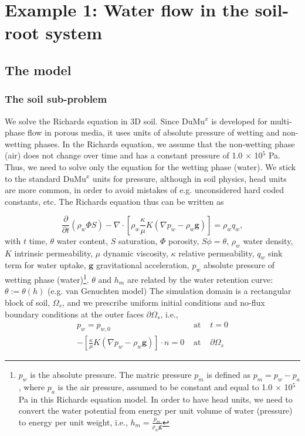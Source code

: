 \chapter*{Example 1: Water flow in the soil-root system}

\section*{The model}
\subsection*{The soil sub-problem}
We solve the Richards equation in 3D soil. Since DuMu$^x$ is developed for multi-phase flow in porous media, it uses units of absolute pressure of wetting and non-wetting phases. In the Richards equation, we assume that the non-wetting phase (air) does not change over time and has a constant pressure of 1.0 $\times$ 10$^5$ Pa. Thus, we need to solve only the equation for the wetting phase (water). We stick to the standard DuMu$^x$ units for pressure, although in soil physics, head units are more common, in order to avoid mistakes of e.g. unconsidered hard coded constants, etc. The Richards equation thus can be written as 

\begin{equation}
\frac{\partial}{\partial t} \left(\rho_w \Phi S \right) - \nabla  \cdot \left[\rho_w \frac{\kappa}{\mu}K \left(\nabla p_w-\rho_w \mathbf{g} \right) \right] = \rho_w q_w,
\end{equation}
with $t$ time, $\theta$ water content, $S$ saturation, $\Phi$ porosity, $S \phi = \theta$, $\rho_w$ water density, $K$ intrinsic permeability, $\mu$ dynamic viscosity, $\kappa$ relative permeability, $q_w$ sink term for water uptake, $\mathbf{g}$ gravitational acceleration, $p_w$ absolute pressure of wetting phase (water)\footnote{$p_w$ is the absolute pressure. The matric pressure $p_m$ is defined as $p_m = p_w-p_a$, where $p_a$ is the air pressure, assumed to be constant and equal to 1.0 $\times$ 10$^5$ Pa in this Richards equation model. In order to have head units, we need to convert the water potential from energy per unit volume of water (pressure) to energy per unit weight, i.e., $h_m=\frac{p_m}{\rho_w \mathbf{g}}$}. $\theta$ and $h_m$ are related by the water retention curve: $\theta:= \theta(h)$ (e.g. van Genuchten model)
The simulation domain is a rectangular block of soil, $\Omega_s$, and we prescribe uniform initial conditions and no-flux boundary conditions at the outer faces $\partial \Omega_s$, i.e.,
\begin{eqnarray}
p_w = p_{w,0} & \text{ at } & t=0\\
-\left[\frac{\kappa}{\mu}K \left(\nabla p_w-\rho_w \mathbf{g} \right) \right]\cdot n = 0 & \text{ at } & \partial \Omega_s
\end{eqnarray}

